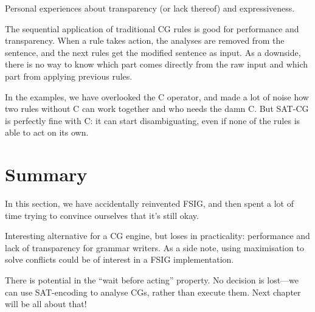 

Personal experiences about transparency (or lack thereof) and expressiveness.


The sequential application of traditional CG rules is good for
performance and transparency. When a rule takes action, the analyses
are removed from the sentence, and the next rules get the modified
sentence as input. 
As a downside, there is no way to know which part comes directly from the
raw input and which part from applying previous rules.

In the examples, we have overlooked the C operator, and made a lot of noise how two rules without C can work together and who needs the damn C.
But SAT-CG is perfectly fine with C: it can start disambiguating, even if none of the rules is able to act on its own. 





\section{Summary}

In this section, we have accidentally reinvented FSIG, and then spent a lot of time trying to convince ourselves that it's still okay.


Interesting alternative for a CG engine, but loses in practicality: performance and lack of transparency for grammar writers.  
As a side note, using maximisation to solve conflicts could be of interest in a FSIG implementation.

There is potential in the ``wait before acting'' property. No decision is lost---we can use SAT-encoding to analyse CGs, rather than execute them. Next chapter will be all about that!



